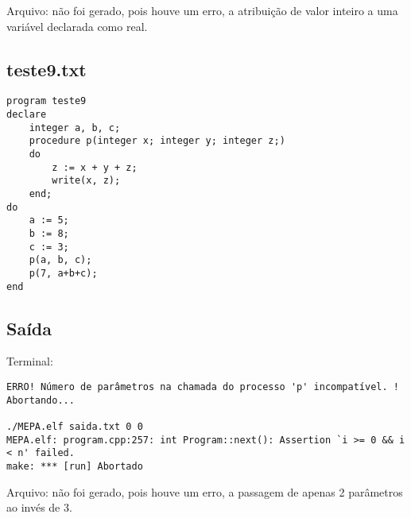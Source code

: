 \documentclass[a4paper,12pt]{article}
\begin{document}
Arquivo: não foi gerado, pois houve um erro, a atribuição de valor inteiro a uma variável declarada como real.

\subsection{teste9.txt}

\begin{footnotesize}\begin{verbatim}
program teste9
declare
	integer a, b, c;
	procedure p(integer x; integer y; integer z;)
	do
		z := x + y + z;
		write(x, z);
	end;
do
	a := 5;
	b := 8;
	c := 3;
	p(a, b, c);
	p(7, a+b+c);
end
\end{verbatim}\end{footnotesize}

\subsection{Saída}
Terminal: 
\begin{footnotesize}\begin{verbatim}
ERRO! Número de parâmetros na chamada do processo 'p' incompatível. ! Abortando...

./MEPA.elf saida.txt 0 0
MEPA.elf: program.cpp:257: int Program::next(): Assertion `i >= 0 && i < n' failed.
make: *** [run] Abortado
\end{verbatim}\end{footnotesize}

Arquivo: não foi gerado, pois houve um erro, a passagem de apenas 2 parâmetros ao invés de 3.
\end{document}
